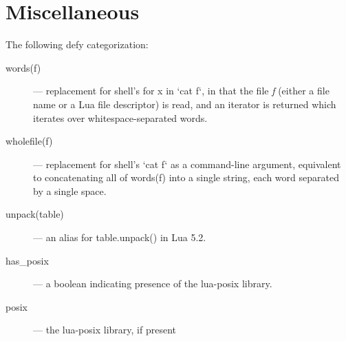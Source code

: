 \section{Miscellaneous}

The following defy categorization:

\begin{description}
\item[words(f)] --- replacement for shell's {\ex for x in `cat f`}, in
that the file \emph{f} (either a file name or a Lua file descriptor)
is read, and an iterator is returned which iterates over
whitespace-separated words.
\item[wholefile(f)] --- replacement for shell's {\ex `cat f`} as a
command-line argument, equivalent to concatenating all of {\ex
words(f)} into a single string, each word separated by a single space.
\item[unpack(table)] --- an alias for {\ex table.unpack()} in Lua 5.2.
\item[has\_posix] --- a boolean indicating presence of the lua-posix
library.
\item[posix] --- the lua-posix library, if present
\end{description}





